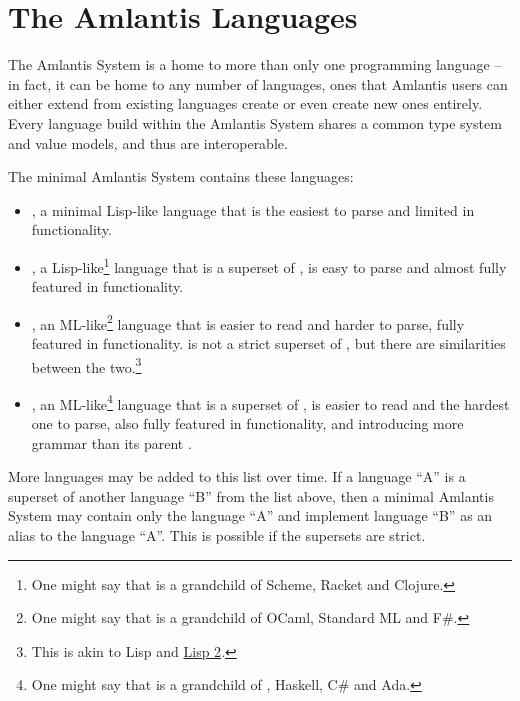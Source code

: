 \newpage

\section{The Amlantis Languages}
\label{sec:amlantis-languages}

The Amlantis System is a home to more than only one programming language -- in fact, it can be home to any number of languages, ones that Amlantis users can either extend from existing languages create or even create new ones entirely. Every language build within the Amlantis System shares a common type system and value models, and thus are interoperable.

The minimal Amlantis System contains these languages:

\begin{itemize}
  \item \AmlKernel, a minimal Lisp-like language that is the easiest to parse and limited in functionality.
  
  \item \AmlBase, a Lisp-like\footnote{One might say that \AmlBase is a grandchild of Scheme, Racket and Clojure.} language that is a superset of \AmlKernel, is easy to parse and almost fully featured in functionality.
  
  \item \AmlCore, an ML-like\footnote{One might say that \AmlCore is a grandchild of OCaml, Standard ML and F\#.} language that is easier to read and harder to parse, fully featured in functionality. \AmlCore is not a strict superset of \AmlBase, but there are similarities between the two.\footnote{This is akin to Lisp and \href{https://en.wikipedia.org/wiki/LISP_2}{Lisp 2}.}
  
  \item \Aml, an ML-like\footnote{One might say that \Aml is a grandchild of \AmlCore, Haskell, C\# and Ada.} language that is a superset of \AmlCore, is easier to read and the hardest one to parse, also fully featured in functionality, and introducing more grammar than its parent \AmlCore.
  
\end{itemize}

More languages may be added to this list over time. If a language ``A'' is a superset of another language ``B'' from the list above, then a minimal Amlantis System may contain only the language ``A'' and implement language ``B'' as an alias to the language ``A''. This is possible if the supersets are strict. 







